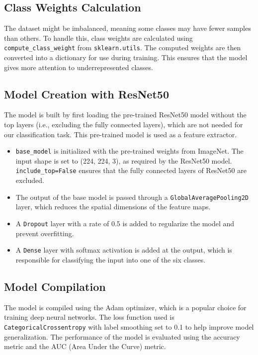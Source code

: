 \documentclass[journal]{IEEEtran}
\begin{document}
\subsection{Class Weights Calculation}

The dataset might be imbalanced, meaning some classes may have fewer samples than others. To handle this, class weights are calculated using \texttt{compute\_class\_weight} from \texttt{sklearn.utils}. The computed weights are then converted into a dictionary for use during training. This ensures that the model gives more attention to underrepresented classes.

\subsection{Model Creation with ResNet50}

The model is built by first loading the pre-trained ResNet50 model without the top layers (i.e., excluding the fully connected layers), which are not needed for our classification task. This pre-trained model is used as a feature extractor.

\begin{itemize}
    \item \texttt{base\_model} is initialized with the pre-trained weights from ImageNet. The input shape is set to (224, 224, 3), as required by the ResNet50 model. \texttt{include\_top=False} ensures that the fully connected layers of ResNet50 are excluded.
    \item The output of the base model is passed through a \texttt{GlobalAveragePooling2D} layer, which reduces the spatial dimensions of the feature maps.
    \item A \texttt{Dropout} layer with a rate of 0.5 is added to regularize the model and prevent overfitting.
    \item A \texttt{Dense} layer with softmax activation is added at the output, which is responsible for classifying the input into one of the six classes\cite{prof-koc}.
\end{itemize}

\subsection{Model Compilation}

The model is compiled using the Adam optimizer, which is a popular choice for training deep neural networks. The loss function used is \texttt{CategoricalCrossentropy} with label smoothing set to 0.1 to help improve model generalization. The performance of the model is evaluated using the accuracy metric and the AUC (Area Under the Curve) metric.
\end{document}
